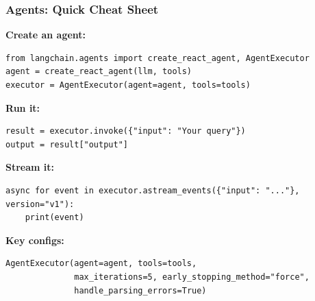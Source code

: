 \documentclass[aspectratio=169,11pt]{beamer}
\begin{document}
\begin{frame}[fragile]
\frametitle{Agents: Quick Cheat Sheet}

\textbf{Create an agent:}
\begin{lstlisting}
from langchain.agents import create_react_agent, AgentExecutor
agent = create_react_agent(llm, tools)
executor = AgentExecutor(agent=agent, tools=tools)
\end{lstlisting}

\textbf{Run it:}
\begin{lstlisting}
result = executor.invoke({"input": "Your query"})
output = result["output"]
\end{lstlisting}

\textbf{Stream it:}
\begin{lstlisting}
async for event in executor.astream_events({"input": "..."}, version="v1"):
    print(event)
\end{lstlisting}

\textbf{Key configs:}
\begin{lstlisting}
AgentExecutor(agent=agent, tools=tools,
              max_iterations=5, early_stopping_method="force",
              handle_parsing_errors=True)
\end{lstlisting}

\end{frame}
\end{document}
